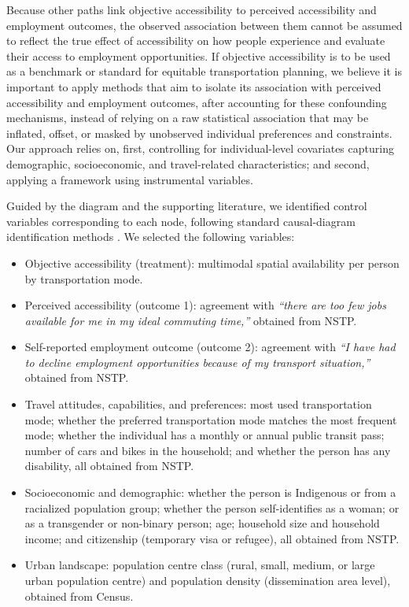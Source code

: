 \documentclass[preprint, 3p,
authoryear]{elsarticle} %
\providecommand{\tightlist}{%
  \setlength{\itemsep}{0pt}\setlength{\parskip}{0pt}}
\begin{document}
Because other paths link objective accessibility to perceived
accessibility and employment outcomes, the observed association between
them cannot be assumed to reflect the true effect of accessibility on
how people experience and evaluate their access to employment
opportunities. If objective accessibility is to be used as a benchmark
or standard for equitable transportation planning, we believe it is
important to apply methods that aim to isolate its association with
perceived accessibility and employment outcomes, after accounting for
these confounding mechanisms, instead of relying on a raw statistical
association that may be inflated, offset, or masked by unobserved
individual preferences and constraints. Our approach relies on, first,
controlling for individual-level covariates capturing demographic,
socioeconomic, and travel-related characteristics; and second, applying
a framework using instrumental variables.

Guided by the diagram and the supporting literature, we identified
control variables corresponding to each node, following standard
causal-diagram identification methods
\citep{cunningham2021causal, huntington-klein2021}. We selected the
following variables:

\begin{itemize}
\tightlist
\item
  Objective accessibility (treatment): multimodal spatial availability
  per person by transportation mode.
\item
  Perceived accessibility (outcome 1): agreement with \emph{``there are
  too few jobs available for me in my ideal commuting time,''} obtained
  from NSTP.
\item
  Self-reported employment outcome (outcome 2): agreement with \emph{``I
  have had to decline employment opportunities because of my transport
  situation,''} obtained from NSTP.
\item
  Travel attitudes, capabilities, and preferences: most used
  transportation mode; whether the preferred transportation mode matches
  the most frequent mode; whether the individual has a monthly or annual
  public transit pass; number of cars and bikes in the household; and
  whether the person has any disability, all obtained from NSTP.
\item
  Socioeconomic and demographic: whether the person is Indigenous or
  from a racialized population group; whether the person self-identifies
  as a woman; or as a transgender or non-binary person; age; household
  size and household income; and citizenship (temporary visa or
  refugee), all obtained from NSTP.
\item
  Urban landscape: population centre class (rural, small, medium, or
  large urban population centre) and population density (dissemination
  area level), obtained from Census.
\end{itemize}
\end{document}
